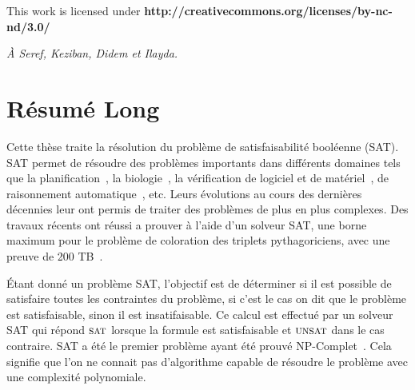 \clearpage\null\vfill
\thispagestyle{empty}
\begin{minipage}[b]{.9\textwidth}
  \begin{center}
  \setlength{\parskip}{.5\baselineskip}
  {\color{phdcol0}%
   \ccLogo\hspace{.1cm}%
   \ccAttribution\hspace{.1cm}%
   \ccNonCommercial\hspace{.1cm}%
   \ccNoDerivatives}\hspace{.15cm}%
  \footnotesize%
  This work is licensed under {\color{phdcol1}\textbf{http://creativecommons.org/licenses/by-nc-nd/3.0/}}
  \end{center}
\end{minipage}
\vspace*{2\baselineskip}
\clearpage
\thispagestyle{empty}
\begin{flushright}
  \textit{À Seref, Keziban, Didem et Ilayda.}
\end{flushright}
%
%
%
%

\chapter*{Résumé Long}


Cette thèse traite la résolution du problème de satisfaisabilité booléenne (SAT).
SAT permet de résoudre des problèmes importants dans différents domaines tels 
que la planification~\cite{planning_92}, la biologie~\cite{biology_06}, la vérification de logiciel et de 
matériel~\cite{biere1999symbolic}, de raisonnement automatique~\cite{heule2016solving}, etc.
Leurs évolutions au cours des dernières décennies leur ont permis de traiter des problèmes de plus en plus complexes.
Des travaux récents ont réussi a prouver à l'aide d'un solveur SAT, une borne maximum
pour le problème de coloration des triplets pythagoriciens, avec une preuve de 200 TB~\cite{heule2016solving}.


Étant donné un problème SAT, l'objectif est de  déterminer si il est possible de satisfaire toutes les contraintes du
problème, si c'est le cas on dit que le problème est satisfaisable, sinon il est insatifaisable.
%
Ce calcul est effectué par un solveur SAT qui répond $\textsc{sat}$ lorsque la formule est satisfaisable et $\textsc{unsat}$ dans le cas
contraire. SAT a été le premier problème ayant été prouvé NP-Complet~\cite{cook1971complexity}. Cela signifie que
l'on ne connait pas d'algorithme capable de résoudre le problème avec une complexité polynomiale.


